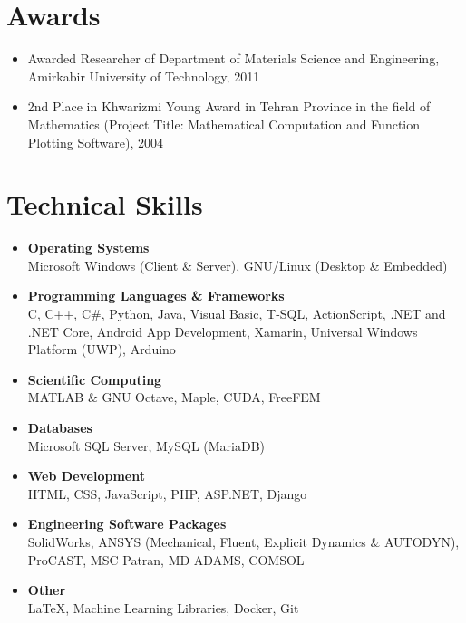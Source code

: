 \documentclass{cv}
\begin{document}

\section{Awards}

\begin{itemize}
\item
Awarded Researcher of Department of Materials Science and Engineering, Amirkabir University of Technology, 2011
\item
2nd Place in Khwarizmi Young Award in Tehran Province in the field of Mathematics (Project Title: Mathematical Computation and Function Plotting Software), 2004
\end{itemize}


\section{Technical Skills}

\begin{itemize}

\item
 \textbf{Operating Systems} \\ Microsoft Windows (Client \& Server), GNU/Linux (Desktop \& Embedded)
 \item
\textbf{Programming Languages \& Frameworks}\\  C, C++, C\#, Python, Java, Visual Basic, T-SQL, ActionScript, .NET and .NET Core, Android App Development, Xamarin, Universal Windows Platform (UWP), Arduino
\item
\textbf{Scientific Computing}\\  MATLAB \& GNU Octave, Maple, CUDA, FreeFEM
\item
\textbf{Databases}\\ Microsoft SQL Server, MySQL (MariaDB)
\item
\textbf{Web Development} \\
HTML, CSS, JavaScript, PHP, ASP.NET, Django
\item
\textbf{Engineering Software Packages}\\ SolidWorks, ANSYS (Mechanical, Fluent, Explicit Dynamics \& AUTODYN), ProCAST, MSC Patran, MD ADAMS, COMSOL
\item
\textbf{Other}\\  \LaTeX{}, Machine Learning Libraries, Docker, Git

\end{itemize}
\end{document}
